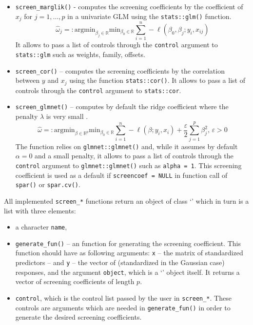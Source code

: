 \documentclass[
  article,
  nojss]{jss}
\newcommand{\class}[1]{`\code{#1}'}
\begin{document}
\begin{itemize}
\item
  \texttt{screen\_marglik()} - computes the screening coefficients by
  the coefficient of \(x_j\) for \(j =1,\dots,p\) in a univariate GLM
  using the \texttt{stats::glm()} function. \[
   \hat\omega_j=:\text{argmin}_{\beta_j\in \mathbb{R}}\text{min}_{{\beta_0}\in\mathbb{R}}\sum_{i=1}^n -\ell(\beta_0,\beta_j;y_i,x_{ij})
   \] It allows to pass a list of controls through the \texttt{control}
  argument to \texttt{stats::glm} such as weights, family, offsets.
\item
  \texttt{screen\_cor()} -- computes the screening coefficients by the
  correlation between \(y\) and \(x_j\) using the function
  \texttt{stats::cor()}. It allows to pass a list of controls through
  the \texttt{control} argument to \texttt{stats::cor}.
\item
  \texttt{screen\_glmnet()} -- computes by default the ridge coefficient
  where the penalty \(\lambda\) is very small \citep[see][ for
  clarification]{parzer2024glms}. \[
  \hat\omega=: \text{argmin}_{\beta\in \mathbb{R}^p}\text{min}_{{\beta_0}\in\mathbb{R}}\sum_{i=1}^n -\ell(\beta;y_i,x_i) + \frac{\varepsilon}{2}\sum_{j=1}^p{\beta}_j^2, \, \varepsilon > 0
  \] The function relies on \texttt{glmnet::glmnet()} and, while it
  assumes by default \(\alpha = 0\) and a small penalty, it allows to
  pass a list of controls through the \texttt{control} argument to
  \texttt{glmnet::glmnet()} such as \texttt{alpha\ =\ 1}. This screening
  coefficient is used as a default if \texttt{screencoef\ =\ NULL} in
  function call of \texttt{spar()} or \texttt{spar.cv()}.
\end{itemize}

All implemented \texttt{screen\_*} functions return an object of class
\class{screencoef} which in turn is a list with three elements:

\begin{itemize}
\item
  a character \texttt{name},
\item
  \texttt{generate\_fun()} -- an  function for generating
  the screening coefficient. This function should have as following
  arguments: \texttt{x} -- the matrix of standardized predictors -- and
  \texttt{y} -- the vector of (standardized in the Gaussian case)
  responses, and the argument \texttt{object}, which is a
  \class{screencoef} object itself. It returns a vector of screening
  coefficients of length \(p\).
\item
  \texttt{control}, which is the control list passed by the user in
  \texttt{screen\_*}. These controls are arguments which are needed in
  \texttt{generate\_fun()} in order to generate the desired screening
  coefficients.
\end{itemize}
\end{document}
